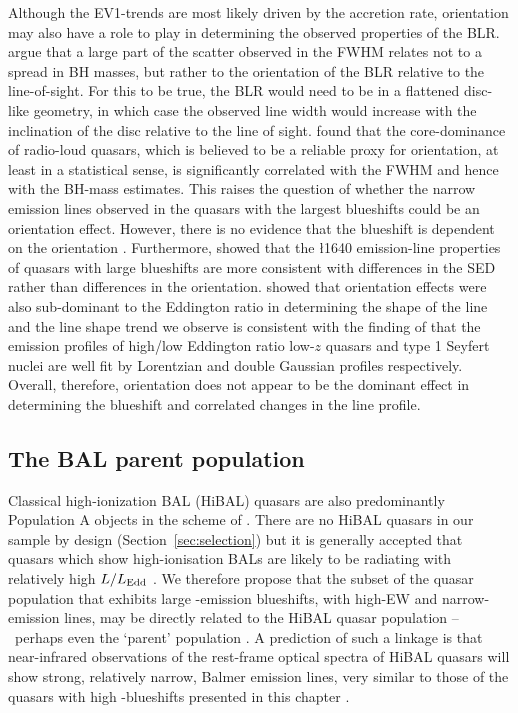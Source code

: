 Although the EV1-trends \citep{sulentic00b,shen14} are most likely driven by the accretion rate, orientation may also have a role to play in determining the observed properties of the BLR. 
\citet{shen14} argue that a large part of the scatter observed in the \hb FWHM relates not to a spread in BH masses, but rather to the orientation of the BLR relative to the line-of-sight.
For this to be true, the BLR would need to be in a flattened disc-like geometry, in which case the observed line width would increase with the inclination of the disc relative to the line of sight. 
\citet{brotherton15b} found that the core-dominance of radio-loud quasars, which is believed to be a reliable proxy for orientation, at least in a statistical sense, is significantly correlated with the \hb FWHM and hence with the BH-mass estimates. 
This raises the question of whether the narrow \ha emission lines observed in the quasars with the largest  blueshifts could be an orientation effect. 
However, there is no evidence that the  blueshift is dependent on the orientation \citep[inferred from the radio core-dominance;][]{richards11,runnoe14}. 
Furthermore, \citet{leighly04} showed that the \l1640 emission-line properties of quasars with large  blueshifts are more consistent with differences in the SED rather than differences in the orientation.
\citet{collin06} showed that orientation effects were also sub-dominant to the Eddington ratio in determining the shape of the \hb line and
the \ha line shape trend we observe is consistent with the finding of \citet{marziani03} that the \hb emission profiles of high/low Eddington ratio low-$z$ quasars and type 1 Seyfert nuclei are well fit by Lorentzian and double Gaussian profiles respectively.  
Overall, therefore, orientation does not appear to be the dominant effect in determining the  blueshift and correlated changes in the \ha line profile. 

\subsection{The BAL parent population}

Classical high-ionization BAL (HiBAL) quasars are also predominantly Population A objects in the scheme of \citet{sulentic00b}. 
There are no HiBAL quasars in our sample by design (Section~\ref{sec:selection}) but it is generally accepted that quasars which show high-ionisation BALs are likely to be radiating with relatively high $L/L_{\rm Edd}$ \citep[e.g.][]{zhang14}. 
We therefore propose that the subset of the quasar population that exhibits large -emission blueshifts, with high-EW and narrow-\ha emission lines, may be directly related to the HiBAL quasar population \---\ perhaps even the `parent' population \citep{richards06conf}. 
A prediction of such a linkage is that near-infrared observations of the rest-frame optical spectra of HiBAL quasars will show strong, relatively narrow, Balmer emission lines, very similar to those of the quasars with high -blueshifts presented in this chapter \citep[see][for such a study]{runnoe13b}. 


